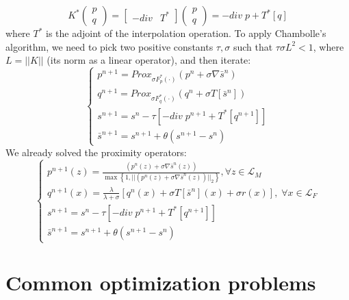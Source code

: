 \documentclass[12pt,draftcls, onecolumn, letterpaper,compsoc]{IEEEtran}
\begin{document}
\begin{equation}
	K^{*}\left(\begin{array}{l}p\\q\end{array}\right) = 
	\left[\begin{array}{cc}
		-div & T^{*}
	\end{array}\right]\left(\begin{array}{l}p\\q\end{array}\right) = 
	-div\;p + T^{*}[q]
\end{equation}
where $T^{*}$ is the adjoint of the interpolation operation. To apply Chambolle's algorithm, we need to pick two positive constants $\tau, \sigma$ such that $\tau\sigma L^{2} < 1$, where $L=||K||$ (its norm as a linear operator), and then iterate:
\begin{equation}
	\left\lbrace\begin{array}{l}
		p^{n+1} = Prox_{\sigma F_{p}^{*}(\cdot)}(p^{n} + \sigma \nabla \bar{s}^{n})\\
		q^{n+1} = Prox_{\sigma F_{q}^{*}(\cdot)}(q^{n} + \sigma T[\bar{s}^{n}])\\
		s^{n+1} = s^{n} - \tau \left[-div\;p^{n+1} + T^{*}[q^{n+1}]\right]\\
		\bar{s}^{n+1} = s^{n+1}+\theta(s^{n+1} - s^{n})
	\end{array}\right.
\end{equation}
We already solved the proximity operators:
\begin{equation}
	\left\lbrace\begin{array}{l}
		p^{n+1}(z) = \frac{(p^{n}(z) + \sigma \nabla \bar{s}^{n}(z))}{\max\left\lbrace1, ||(p^{n}(z) + \sigma \nabla \bar{s}^{n}(z))||_{2}\right\rbrace}, \forall z\in \mathcal{L}_{M}\\
		q^{n+1}(x) = \frac{\lambda}{\lambda+\sigma}\left[q^{n}(x) + \sigma T[\bar{s}^{n}](x) + \sigma r(x)\right],\; \forall x\in \mathcal{L}_F\\
		s^{n+1} = s^{n} - \tau \left[-div\;p^{n+1} + T^{*}[q^{n+1}]\right]\\
		\bar{s}^{n+1} = s^{n+1}+\theta(s^{n+1} - s^{n})
	\end{array}\right.
\end{equation}
\section{Common optimization problems}
\end{document}
